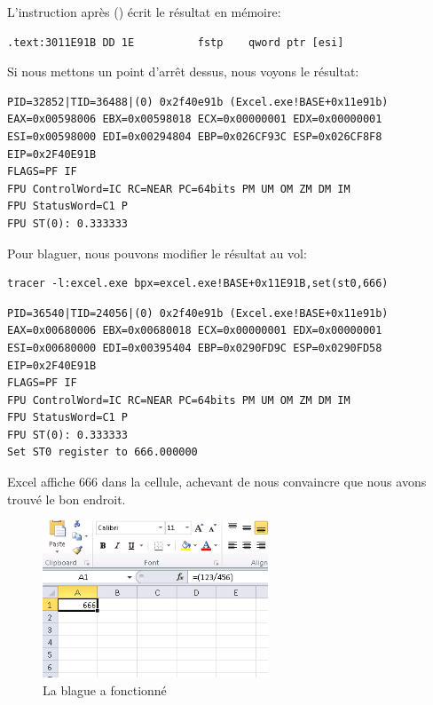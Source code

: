 L'instruction après \FDIV () écrit le résultat en mémoire:\\

\begin{lstlisting}[style=customasmx86]
.text:3011E91B DD 1E          fstp    qword ptr [esi]
\end{lstlisting}

Si nous mettons un point d'arrêt dessus, nous voyons le résultat:

\begin{lstlisting}
PID=32852|TID=36488|(0) 0x2f40e91b (Excel.exe!BASE+0x11e91b)
EAX=0x00598006 EBX=0x00598018 ECX=0x00000001 EDX=0x00000001
ESI=0x00598000 EDI=0x00294804 EBP=0x026CF93C ESP=0x026CF8F8
EIP=0x2F40E91B
FLAGS=PF IF
FPU ControlWord=IC RC=NEAR PC=64bits PM UM OM ZM DM IM
FPU StatusWord=C1 P
FPU ST(0): 0.333333
\end{lstlisting}

Pour blaguer, nous pouvons modifier le résultat au vol:

\begin{lstlisting}
tracer -l:excel.exe bpx=excel.exe!BASE+0x11E91B,set(st0,666)
\end{lstlisting}

\begin{lstlisting}
PID=36540|TID=24056|(0) 0x2f40e91b (Excel.exe!BASE+0x11e91b)
EAX=0x00680006 EBX=0x00680018 ECX=0x00000001 EDX=0x00000001
ESI=0x00680000 EDI=0x00395404 EBP=0x0290FD9C ESP=0x0290FD58
EIP=0x2F40E91B
FLAGS=PF IF
FPU ControlWord=IC RC=NEAR PC=64bits PM UM OM ZM DM IM
FPU StatusWord=C1 P
FPU ST(0): 0.333333
Set ST0 register to 666.000000
\end{lstlisting}

Excel affiche 666 dans la cellule, achevant de nous convaincre que nous avons trouvé
le bon endroit.

\begin{figure}[H]
\centering
\includegraphics[width=0.6\textwidth]{digging_into_code/Excel_prank.png}
\caption{La blague a fonctionné}
\end{figure}

